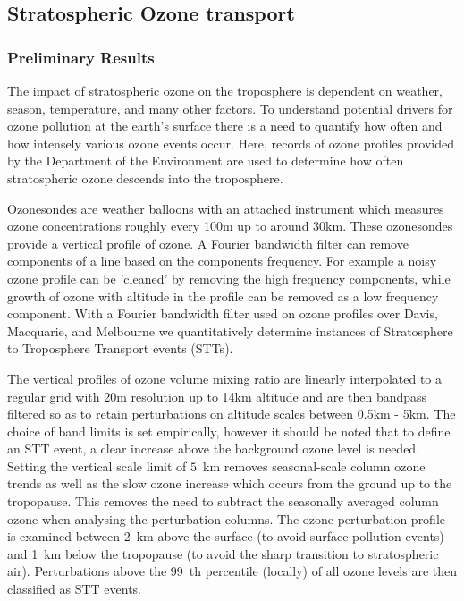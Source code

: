 \subsection{Stratospheric Ozone transport}
\subsubsection{Preliminary Results}
The impact of stratospheric ozone on the troposphere is dependent on weather, season, temperature, and many other factors.
To understand potential drivers for ozone pollution at the earth's surface there is a need to quantify how often and how intensely various ozone events occur.
Here, records of ozone profiles provided by the Department of the Environment are used to determine how often stratospheric ozone descends into the troposphere.

Ozonesondes are weather balloons with an attached instrument which measures ozone concentrations roughly every 100m up to around 30km.
These ozonesondes provide a vertical profile of ozone.
A Fourier bandwidth filter can remove components of a line based on the components frequency.
For example a noisy ozone profile can be 'cleaned' by removing the high frequency components, while growth of ozone with altitude in the profile can be removed as a low frequency component. 
With a Fourier bandwidth filter used on ozone profiles over Davis, Macquarie, and Melbourne we quantitatively determine instances of Stratosphere to Troposphere Transport events (STTs).

The vertical profiles of ozone volume mixing ratio are linearly interpolated to a regular grid with 20m resolution up to 14km altitude and are then bandpass filtered so as to retain perturbations on altitude scales between 0.5km - 5km. 
The choice of band limits is set empirically, however it should be noted that to define an STT event, a clear increase above the background ozone level is needed. Setting the vertical scale limit of $5$~km removes seasonal-scale column ozone trends as well as the slow ozone increase which occurs from the ground up to the tropopause. This removes the need to subtract the seasonally averaged column ozone when analysing the perturbation columns.
The ozone perturbation profile is examined between 2~km above the surface (to avoid surface pollution events) and 1~km below the tropopause (to avoid the sharp transition to stratospheric air).
Perturbations above the 99~th percentile (locally) of all ozone levels are then classified as STT events.


